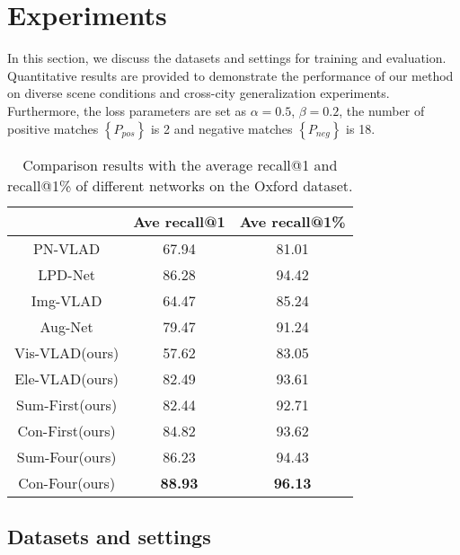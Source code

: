 \documentclass[letterpaper, 10 pt, conference]{ieeeconf}  \usepackage{tabularx}
\begin{document}
\section{Experiments}

In this section, we discuss the datasets and settings for training and evaluation. Quantitative results are provided to demonstrate the performance of our method on diverse scene conditions and cross-city generalization experiments. Furthermore, the loss parameters are set as $\alpha=0.5$, $\beta=0.2$, the number of positive matches $\left\{P_{pos}\right\}$ is 2 and negative matches $\left\{P_{neg}\right\}$ is 18.


\begin{center}
	\begin{table}[tp]
		\vspace{1.5mm}
		\caption{Comparison results with the average recall@1 and recall@1\% of different networks on the Oxford dataset.}
		\centering
		\linespread{1.1}\selectfont
		\begin{tabularx}{7.1cm}{c|c|c}
			\toprule[1.5pt]
			& Ave recall@1 & Ave recall@1\%\\ [1pt]
			\hline
			PN-VLAD & 67.94 & 81.01\\[1pt]
			LPD-Net & 86.28 & 94.42\\[1pt]
			Img-VLAD& 64.47 &85.24\\[1pt]
			Aug-Net& 79.47  &91.24\\[1pt]
			\hline
			Vis-VLAD(ours)& 57.62 & 83.05 \\[1pt]
			Ele-VLAD(ours)& 82.49 & 93.61 \\[1pt]
			Sum-First(ours)& 82.44 & 92.71 \\[1pt]
			Con-First(ours)& 84.82 & 93.62    \\[1pt]
			Sum-Four(ours)& 86.23 & 94.43\\[1pt]
			Con-Four(ours)& \textbf{88.93} & \textbf{96.13}   \\[1pt]
			\toprule[1.5pt]
		\end{tabularx}
		\vspace{-12pt}
		\label{performance}
	\end{table}
\end{center}


\subsection{Datasets and settings}
\end{document}
